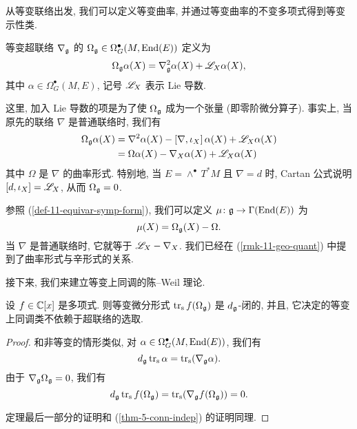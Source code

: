 从等变联络出发, 我们可以定义等变曲率,
并通过等变曲率的不变多项式得到等变示性类.

\begin{definition}
    等变超联络 $\nabla_{\mathfrak{g}}$ 的
    $\Omega_{\mathfrak{g}} \in \Omega_G^\bullet (M, \operatorname{End} (E))$ 定义为
    \[ \Omega_{\mathfrak{g}} \alpha (X) = \nabla_{\mathfrak{g}}^2 \alpha (X) + \mathscr{L}_X \alpha (X), \]
    其中 $\alpha \in \Omega_G^\bullet (M, E)$, 记号 $\mathscr{L}_X$ 表示 Lie 导数.
\end{definition}

这里, 加入 Lie 导数的项是为了使 $\Omega_{\mathfrak{g}}$ 成为一个张量 (即零阶微分算子).
事实上, 当原先的联络 $\nabla$ 是普通联络时, 我们有
\begin{align*}
    \Omega_{\mathfrak{g}} \alpha (X)
    &= \nabla^2 \alpha (X) - [\nabla, \iota_X] \, \alpha (X) + \mathscr{L}_X \alpha (X) \\
    &= \Omega \alpha (X) - \nabla_X \alpha (X) + \mathscr{L}_X \alpha (X) 
\end{align*}
其中 $\Omega$ 是 $\nabla$ 的曲率形式.
特别地, 当 $E = \wedge^\bullet \, T^* M$ 且 $\nabla = d$ 时,
Cartan 公式说明 $[d, \iota_X] = \mathscr{L}_X$, 从而 $\Omega_{\mathfrak{g}} = 0$.

\begin{remark} \label{rmk-11-moment-map}
    参照 (\ref{def-11-equivar-symp-form}), 我们可以定义
    $\mu \colon \mathfrak{g} \to \Gamma(\operatorname{End} (E))$ 为
    \[ \mu (X) = \Omega_{\mathfrak{g}} (X) - \Omega. \]
    当 $\nabla$ 是普通联络时, 它就等于 $\mathscr{L}_X - \nabla_X$.
    我们已经在 (\ref{rmk-11-geo-quant}) 中提到了曲率形式与辛形式的关系. \varqed
\end{remark}

接下来, 我们来建立等变上同调的陈--Weil 理论.

\begin{theorem}
    设 $f \in \mathbb{C} [x]$ 是多项式.
    则等变微分形式 $\operatorname{tr}_{\mathrm{s}} f(\Omega_{\mathfrak{g}})$ 是 $d_{\mathfrak{g}}$-闭的,
    并且, 它决定的等变上同调类不依赖于超联络的选取.
\end{theorem}

\begin{proof}
    和非等变的情形类似, 对 $\alpha \in \Omega_G^\bullet (M, \operatorname{End}(E))$, 我们有
    \[ d_{\mathfrak{g}} \operatorname{tr}_{\mathrm{s}} \alpha = \operatorname{tr}_{\mathrm{s}} (\nabla_{\mathfrak{g}} \alpha). \]
    由于 $\nabla_{\mathfrak{g}} \Omega_{\mathfrak{g}} = 0$, 我们有
    \[ d_{\mathfrak{g}} \operatorname{tr}_{\mathrm{s}} f(\Omega_{\mathfrak{g}}) = \operatorname{tr}_{\mathrm{s}} (\nabla_{\mathfrak{g}} f(\Omega_{\mathfrak{g}})) = 0. \]
    
    定理最后一部分的证明和 (\ref{thm-5-conn-indep}) 的证明同理.
\end{proof}

